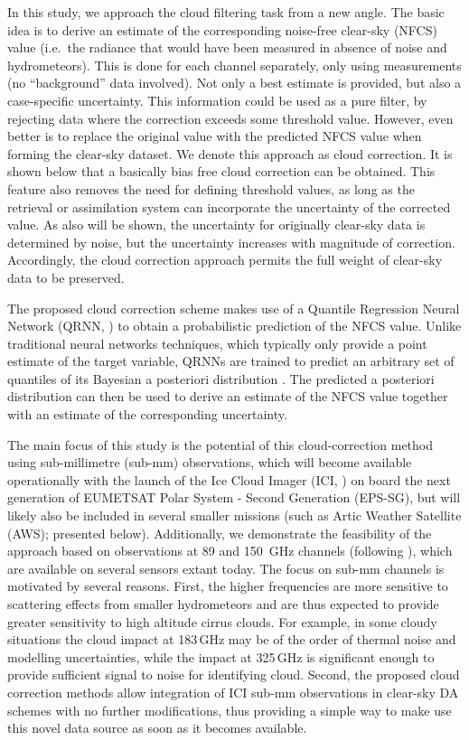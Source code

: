 \documentclass[amt, manuscript]{copernicus}
\begin{document}
In this study, we approach the cloud filtering task from a new angle. The basic idea
is to derive an estimate of the corresponding noise-free clear-sky (NFCS) value
(i.e.\ the radiance that would have been measured in absence of noise and
hydrometeors). This is done for each channel separately, only using
measurements (no ``background'' data involved). Not only a best estimate is
provided, but also a case-specific uncertainty. This information could be used as a pure filter, by rejecting data where the correction exceeds some threshold value. However, even
better is to replace the original value with the predicted NFCS value when
forming the clear-sky dataset. We denote this approach as cloud correction. It
is shown below that a basically bias free cloud correction can be obtained.
This feature also removes the need for defining threshold values, as long as the retrieval or
assimilation system can incorporate the uncertainty of the corrected value. As
also will be shown, the uncertainty for originally clear-sky data is determined
by noise, but the uncertainty increases with magnitude of correction.
Accordingly, the cloud correction approach permits the full weight of
clear-sky data to be preserved.

The proposed cloud correction scheme makes use of a Quantile Regression Neural
Network (QRNN, \citet{pfreundschuh:aneur:18}) to obtain a probabilistic prediction of the NFCS value. Unlike traditional neural networks techniques, which typically only provide a point
estimate of the target variable, QRNNs are trained to predict an arbitrary set
of quantiles of its Bayesian a posteriori distribution
\citep{pfreundschuh:aneur:18}. The predicted a posteriori distribution 
can then be used to derive an estimate of the NFCS value together with an estimate
of the corresponding uncertainty.

The main focus of this study is the potential of this cloud-correction
method using sub-millimetre (sub-mm) observations, which will become available
operationally with the launch of the Ice Cloud Imager (ICI,
\citet{eriksson:towar:20}) on board the next generation of EUMETSAT Polar System - Second Generation (EPS-SG), but will likely also be included in
several smaller missions (such as Artic Weather Satellite (AWS); presented
below). Additionally, we demonstrate the feasibility of the approach based on
observations at 89 and 150\ GHz channels (following
\citet{geer2015scatteringindex}), which are available on several sensors extant today. The focus
on sub-mm channels is motivated by several reasons. First, the higher
frequencies are more sensitive to scattering effects from smaller
hydrometeors and are thus expected to provide greater sensitivity to high altitude cirrus clouds. For example, in some cloudy situations the
cloud impact at 183\,GHz may be of the order of thermal noise and modelling uncertainties,
while the impact at 325\,GHz is significant enough to provide sufficient signal to noise for identifying cloud. Second, the proposed
cloud correction methods allow integration of ICI sub-mm observations in
clear-sky DA schemes with no further modifications, thus providing a simple
way to make use this novel data source as soon as it becomes available.
\end{document}
